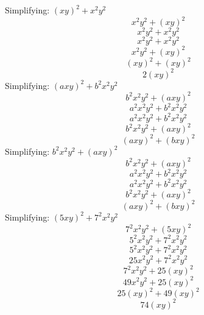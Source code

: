 \documentclass[10pt]{article}
\begin{document}
Simplifying: $(xy)^{2} + x^{2}y^{2}$
$$x^{2}y^{2} + (xy)^{2}$$
$$x^{2}y^{2} + x^{2}y^{2}$$
$$x^{2}y^{2} + x^{2}y^{2}$$
$$x^{2}y^{2} + (xy)^{2}$$
$$(xy)^{2} + (xy)^{2}$$
$$2(xy)^{2}$$
Simplifying: $(axy)^{2} + b^{2}x^{2}y^{2}$
$$b^{2}x^{2}y^{2} + (axy)^{2}$$
$$a^{2}x^{2}y^{2} + b^{2}x^{2}y^{2}$$
$$a^{2}x^{2}y^{2} + b^{2}x^{2}y^{2}$$
$$b^{2}x^{2}y^{2} + (axy)^{2}$$
$$(axy)^{2} + (bxy)^{2}$$
Simplifying: $b^{2}x^{2}y^{2} + (axy)^{2}$
$$b^{2}x^{2}y^{2} + (axy)^{2}$$
$$a^{2}x^{2}y^{2} + b^{2}x^{2}y^{2}$$
$$a^{2}x^{2}y^{2} + b^{2}x^{2}y^{2}$$
$$b^{2}x^{2}y^{2} + (axy)^{2}$$
$$(axy)^{2} + (bxy)^{2}$$
Simplifying: $(5xy)^{2} + 7^{2}x^{2}y^{2}$
$$7^{2}x^{2}y^{2} + (5xy)^{2}$$
$$5^{2}x^{2}y^{2} + 7^{2}x^{2}y^{2}$$
$$5^{2}x^{2}y^{2} + 7^{2}x^{2}y^{2}$$
$$25x^{2}y^{2} + 7^{2}x^{2}y^{2}$$
$$7^{2}x^{2}y^{2} + 25(xy)^{2}$$
$$49x^{2}y^{2} + 25(xy)^{2}$$
$$25(xy)^{2} + 49(xy)^{2}$$
$$74(xy)^{2}$$
\end{document}
